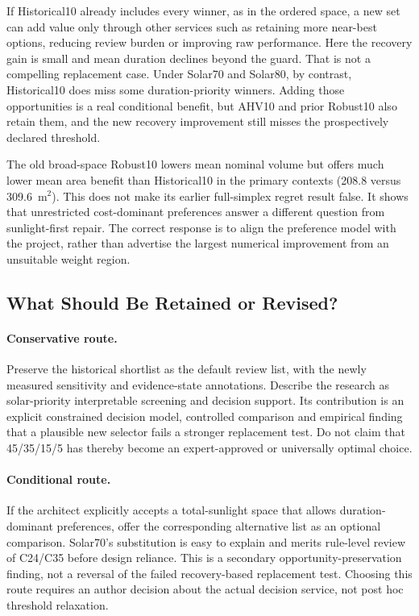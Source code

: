 \documentclass{llncs}
\begin{document}
If Historical10 already includes every winner, as in the ordered space, a new set can add value only through other services such as retaining more near-best options, reducing review burden or improving raw performance. Here the recovery gain is small and mean duration declines beyond the guard. That is not a compelling replacement case. Under Solar70 and Solar80, by contrast, Historical10 does miss some duration-priority winners. Adding those opportunities is a real conditional benefit, but AHV10 and prior Robust10 also retain them, and the new recovery improvement still misses the prospectively declared threshold.

The old broad-space Robust10 lowers mean nominal volume but offers much lower mean area benefit than Historical10 in the primary contexts (208.8 versus 309.6~m$^2$). This does not make its earlier full-simplex regret result false. It shows that unrestricted cost-dominant preferences answer a different question from sunlight-first repair. The correct response is to align the preference model with the project, rather than advertise the largest numerical improvement from an unsuitable weight region.

\subsection{What Should Be Retained or Revised?}
\paragraph{Conservative route.} Preserve the historical shortlist as the default review list, with the newly measured sensitivity and evidence-state annotations. Describe the research as solar-priority interpretable screening and decision support. Its contribution is an explicit constrained decision model, controlled comparison and empirical finding that a plausible new selector fails a stronger replacement test. Do not claim that 45/35/15/5 has thereby become an expert-approved or universally optimal choice.

\paragraph{Conditional route.} If the architect explicitly accepts a total-sunlight space that allows duration-dominant preferences, offer the corresponding alternative list as an optional comparison. Solar70's substitution is easy to explain and merits rule-level review of C24/C35 before design reliance. This is a secondary opportunity-preservation finding, not a reversal of the failed recovery-based replacement test. Choosing this route requires an author decision about the actual decision service, not post hoc threshold relaxation.
\end{document}
